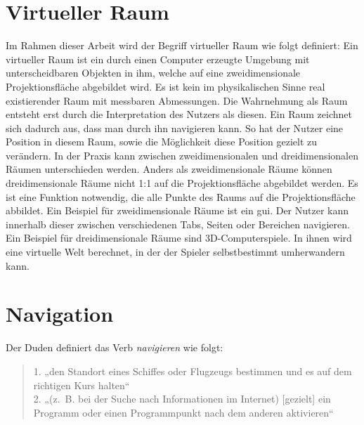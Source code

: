 \section{Virtueller Raum}
Im Rahmen dieser Arbeit wird der Begriff virtueller Raum wie folgt definiert:
Ein virtueller Raum ist ein durch einen Computer erzeugte Umgebung mit unterscheidbaren Objekten in ihm, welche auf eine zweidimensionale Projektionsfläche abgebildet wird.
Es ist kein im physikalischen Sinne real existierender Raum mit messbaren Abmessungen.
Die Wahrnehmung als Raum entsteht erst durch die Interpretation des Nutzers als diesen.
Ein Raum zeichnet sich dadurch aus, dass man durch ihn navigieren kann.
So hat der Nutzer eine Position in diesem Raum, sowie die Möglichkeit diese Position gezielt zu verändern.
In der Praxis kann zwischen zweidimensionalen und dreidimensionalen Räumen unterschieden werden.
Anders als zweidimensionale Räume können dreidimensionale Räume nicht 1:1 auf die Projektionsfläche abgebildet werden.
Es ist eine Funktion notwendig, die alle Punkte des Raums auf die Projektionsfläche abbildet.
Ein Beispiel für zweidimensionale Räume ist ein \ac{gui}.
Der Nutzer kann innerhalb dieser zwischen verschiedenen Tabs, Seiten oder Bereichen navigieren.
Ein Beispiel für dreidimensionale Räume sind 3D-Computerspiele.
In ihnen wird eine virtuelle Welt berechnet, in der der Spieler selbstbestimmt umherwandern kann.

\section{Navigation}
Der Duden definiert das Verb \textit{navigieren} wie folgt:

\begin{quote}
    1. „den Standort eines Schiffes oder Flugzeugs bestimmen und es auf dem richtigen Kurs halten“\\
    2. „(z. B. bei der Suche nach Informationen im Internet) [gezielt] ein Programm oder einen Programmpunkt nach dem anderen aktivieren“
    \cite{DudenNavigierenRechtschreibung}
\end{quote}

